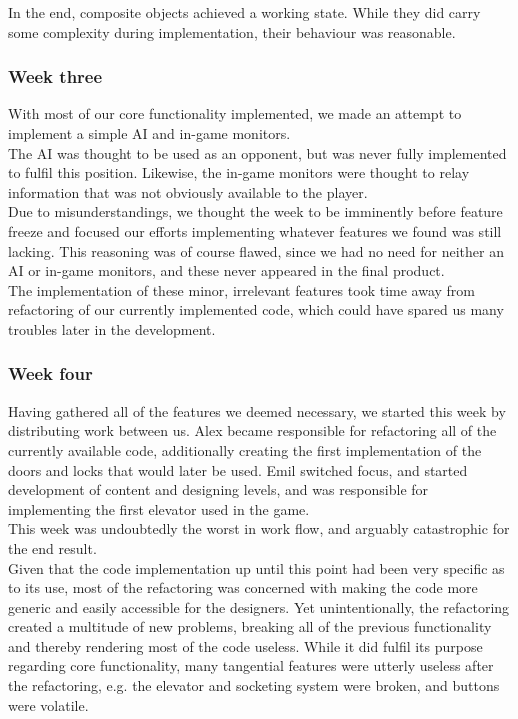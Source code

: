 In the end, composite objects achieved a working state. While they did carry some complexity during implementation, their behaviour was reasonable.

\subsubsection{Week three}
With most of our core functionality implemented, we made an attempt to implement a simple AI and in-game monitors.\\

The AI was thought to be used as an opponent, but was never fully implemented to fulfil this position. Likewise, the in-game monitors were thought to relay information that was not obviously available to the player.\\

Due to misunderstandings, we thought the week to be imminently before feature freeze and focused our efforts implementing whatever features we found was still lacking. This reasoning was of course flawed, since we had no need for neither an AI or in-game monitors, and these never appeared in the final product.\\

The implementation of these minor, irrelevant features took time away from refactoring of our currently implemented code, which could have spared us many troubles later in the development.

\subsubsection{Week four}
Having gathered all of the features we deemed necessary, we started this week by distributing work between us. Alex became responsible for refactoring all of the currently available code, additionally creating the first implementation of the doors and locks that would later be used. Emil switched focus, and started development of content and designing levels, and was responsible for implementing the first elevator used in the game.\\

This week was undoubtedly the worst in work flow, and arguably catastrophic for the end result.\\

Given that the code implementation up until this point had been very specific as to its use, most of the refactoring was concerned with making the code more generic and easily accessible for the designers. Yet unintentionally, the refactoring created a multitude of new problems, breaking all of the previous functionality and thereby rendering most of the code useless. While it did fulfil its purpose regarding core functionality, many tangential features were utterly useless after the refactoring, e.g. the elevator and socketing system were broken, and buttons were volatile.\\

